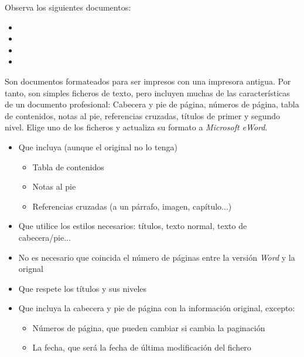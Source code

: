 \begin{homeworkProblem}
  Observa los siguientes documentos:
  \begin{itemize}
  \item {}
  \item {}
  \item {}
  \item {}      
  \end{itemize}

  Son documentos formateados para ser impresos con una impresora antigua. Por tanto, son simples ficheros de texto, pero incluyen muchas de las características de un documento profesional: Cabecera y pie de página,  números de página,  tabla de contenidos,  notas al pie,  referencias cruzadas,  títulos de primer y segundo nivel. Elige uno de los ficheros y actualiza su formato a \textit{Microsoft eWord}.



  \begin{Aviso}

    \begin{itemize}
    \item Que incluya (aunque el original no lo tenga)
      \begin{itemize}
      \item Tabla de contenidos
      \item Notas al pie
      \item Referencias cruzadas (a un párrafo, imagen, capítulo...)
      \end{itemize}
    \item Que utilice los estilos necesarios: títulos, texto normal, texto de cabecera/pie...
    \item No es necesario que coincida el número de páginas entre la versión \textit{Word} y la orignal    
    \item Que respete los títulos y sus niveles
    \item Que incluya la cabecera y pie de página con la información original, excepto:
      \begin{itemize}
      \item Números de página, que pueden cambiar si cambia la paginación
      \item La fecha, que será la fecha de última modificación del fichero
      \end{itemize}
    \end{itemize}
  \end{Aviso}
\end{homeworkProblem}

